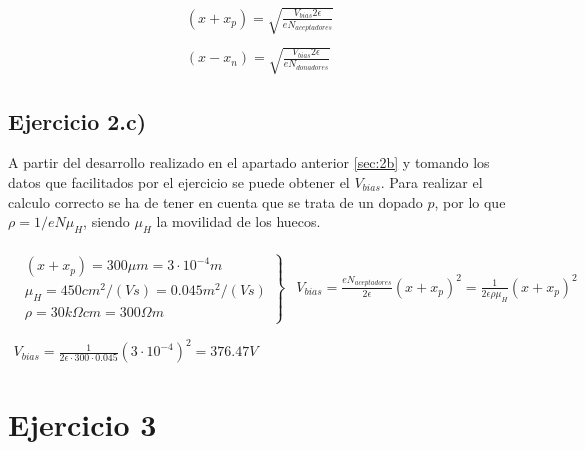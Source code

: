 \documentclass[twoside]{article}
\begin{document}
				\begin{equation}
					\begin{matrix}
						(x + x_p) = \sqrt{\frac{V_{bias}2\epsilon}{eN_{aceptadores}}}

						\\
						\\

						(x - x_n) = \sqrt{\frac{V_{bias}2\epsilon}{eN_{donadores}}}
						
					\end{matrix}
				\end{equation}

		\subsection{Ejercicio 2.c)}
			\label{sec:2c}

			A partir del desarrollo realizado en el apartado anterior \ref{sec:2b} y tomando los datos que facilitados por el ejercicio se puede obtener el $V_{bias}$. Para realizar el calculo correcto se ha de tener en cuenta que se trata de un dopado $p$, por lo que $\rho = 1/ e N \mu_H$, siendo $\mu_H$ la movilidad de los huecos.  

				\begin{equation}
					\begin{matrix}
						\begin{matrix}
							\left.\begin{matrix}
								(x+x_p) = 300 \mu m = 3 \cdot 10^{-4} m
								\\
								\mu_H = 450 cm^2 /(Vs) = 0.045 m^2 /(Vs)
								\\
								\rho = 30 k\Omega cm = 300 \Omega m
							\end{matrix}\right\}
							&
							V_{bias} = \frac{eN_{aceptadores}}{2\epsilon} (x+x_p)^2 = \frac{1}{2\epsilon\rho\mu_H} (x+x_p)^2
						\end{matrix}
						\\ \\
						V_{bias} = \frac{1}{2\epsilon \cdot 300 \cdot 0.045} (3 \cdot 10^{-4})^2 = 376.47 V
					\end{matrix}
				\end{equation}

	\section{Ejercicio 3}
\end{document}
